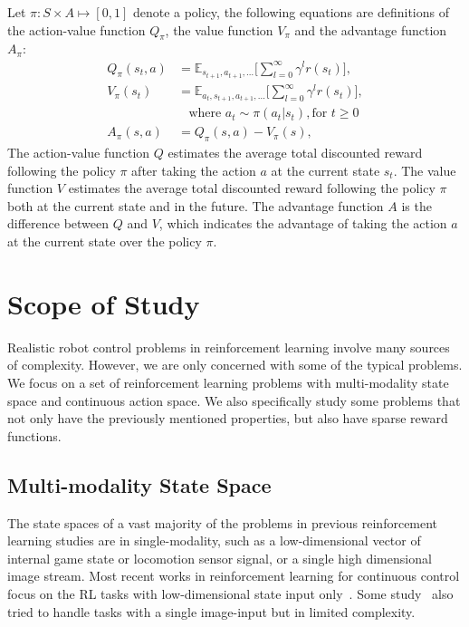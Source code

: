 Let $\pi : S \times A \mapsto [0,1] $ denote a policy, the following equations are definitions of the action-value function $Q_\pi $, the value function $V_\pi $ and the advantage function $A_\pi $:
\begin{align}
Q_\pi(s_t,a) &= \mathbb{E}_{s_{t+1},a_{t+1},\ldots}
\big[ \sum_{l=0}^\infty \gamma^l r(s_{t}) \big], \\
V_\pi(s_t) &= \mathbb{E}_{a_{t},s_{t+1},a_{t+1},\ldots}
\big[ \sum_{l=0}^\infty \gamma^l  r(s_{t}) \big],\\
& \ \ \ \ \text{where } a_t \sim \pi (a_t|s_t), \text{for } t \geq 0  \\
A_\pi (s,a) &= Q_\pi (s,a) - V_\pi (s), 
\end{align}
The action-value function $Q$ estimates the average total discounted reward following the policy $\pi$ after taking the action $a$ at the current state $s_t$. The value function $V$ estimates the average total discounted reward following the policy $\pi$ both at the current state and in the future. The advantage function $A$ is the difference between $Q$ and $V$, which indicates the advantage of taking the action $a$ at the current state over the policy $\pi$.




\section{Scope of Study}
Realistic robot control problems in reinforcement learning involve many sources of complexity. However, we are only concerned with some of the typical problems.
We focus on a set of reinforcement learning problems with multi-modality state space and continuous action space. We also specifically study some problems that not only have the previously mentioned properties, but also have sparse reward functions.

\subsection{Multi-modality State Space}

The state spaces of a vast majority of the problems in previous reinforcement learning studies are in single-modality, such as a low-dimensional vector of internal game state or locomotion sensor signal, or a single high dimensional image stream. Most recent works in reinforcement learning for continuous control focus on the RL tasks with low-dimensional state input only~\cite{duan2016benchmarking}. Some study~\cite{wu2017scalable} also tried to handle tasks with a single image-input but in limited complexity.

